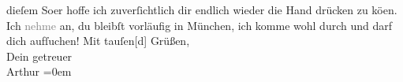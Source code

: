 \begin{ledgroupsized}[t]{13cm}
               dieſem So{\geminationm}er hoffe ich zuverſichtlich dir
               endlich wieder die Hand drücken zu kö{\geminationn}en. Ich
                  \textcolor{gray}{nehme} an, du bleibſt vorläufig in München, {\pb}ich komme wohl durch
               und darf dich aufſuchen!\pend
           \pstart
           Mit tauſen{[}d{]} Grüßen,{\\[\baselineskip]}Dein getreuer{\\[\baselineskip]}\spacefill\mbox{Arthur}\pend
           \leftskip=0em{}
         
         \endnumbering{}\end{ledgroupsized}  \newcommand{\dateiname}{L02385}\newcommand{\titel}{Arthur Schnitzler an Hermann Bahr, 6. 6. 1922}\newcommand{\editorInnen}{ Kurt Ifkovits,  Martin Anton Müller}
      